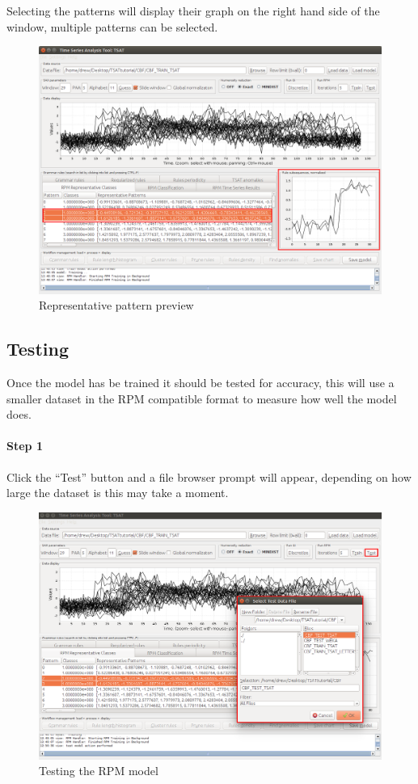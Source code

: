 \documentclass[letterpaper, 12pt]{article}
\begin{document}
\newpage
Selecting the patterns will display their graph on the right hand side of the window, multiple patterns can be selected.

\begin{figure}[H]
	\includegraphics[width=\textwidth]{TSAT-training-step-6}
	\caption{Representative pattern preview}
	\label{fig:TSAT-training-step-6}
\end{figure}


\subsection{Testing}
\label{RPMTest}
Once the model has be trained it should be tested for accuracy, this will use a smaller dataset in the RPM compatible format to measure how well the model does. 

\paragraph{Step 1}
Click the ``Test'' button and a file browser prompt will appear, depending on how large the dataset is this may take a moment. 

\begin{figure}[H]
	\includegraphics[width=\textwidth]{TSAT-testing-step-1}
	\caption{Testing the RPM model}
	\label{fig:TSAT-testing-step-1}
\end{figure}
\end{document}
